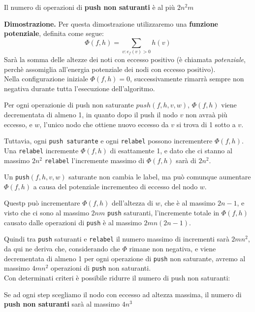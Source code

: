 \begin{myblockquote}
	Il numero di operazioni di \textbf{push non saturanti} è al più $2n^2m$
\end{myblockquote}

\textbf{Dimostrazione.} Per questa dimostrazione utilizzaremo una \textbf{funzione potenziale}, definita come segue:
$$
	\Phi(f, h) = \sum_{v:e_f(v)>0}h(v)
$$
Sarà la somma delle altezze dei noti con eccesso positivo (è chiamata \textit{potenziale}, perchè assomiglia all'energia potenziale dei nodi con eccesso positivo).\\

Nella configurazione iniziale $\Phi(f, h) = 0$, successivamente rimarrà sempre non negativa durante tutta l'esecuzione dell'algoritmo.

Per ogni operazionie di push non saturante $push(f, h, v, w)$, $\Phi(f, h)$ viene decrementata di almeno 1, in quanto dopo il push il nodo $v$ non avraà più eccesso, e $w$, l'unico nodo che ottiene nuovo eccesso da $v$ si trova di 1 sotto a $v$.

Tuttavia, ogni \texttt{push saturante} e ogni \texttt{relabel} possono incrementere $\Phi(f, h)$. Una \texttt{relabel} incremente $\Phi(f, h)$ di esattamente 1, e dato che ci stanno al massimo $2n^2$ \texttt{relabel} l'incremente massimo di $\Phi(f, h)$ sarà di $2n^2$.

Un \texttt{push}$(f, h, v, w)$ saturante non cambia le label, ma può comunque aumentare $\Phi(f, h)$ a causa del potenziale incrementeo di eccesso del nodo $w$.

Questp può incrementare $\Phi(f, h)$ dell'altezza di $w$, che è al massimo $2n-1$, e visto che ci sono al massimo $2nm$ \texttt{push} saturanti, l'incremente totale  in $\Phi(f, h)$
causato dalle operazioni di \texttt{push} è al massimo $2mn(2n-1)$.

Quindi tra \texttt{push} saturanti e \texttt{relabel} il numero massimo di incrementi sarà $2mn^2$, da qui ne deriva che, considerando che $\Phi$ rimane non negativa, e viene decrementata di almeno 1 per ogni operazione di \texttt{push} non saturante, avremo al massimo $4mn^2$ operazioni di \texttt{push} non saturanti.\\

Con determinati criteri è possibile ridurre il numero di push non saturanti:

\begin{myblockquote}
	Se ad ogni step scegliamo il nodo con eccesso ad altezza massima, il numero di \textbf{push non saturanti} sarà al massimo $4n^3$
\end{myblockquote}
